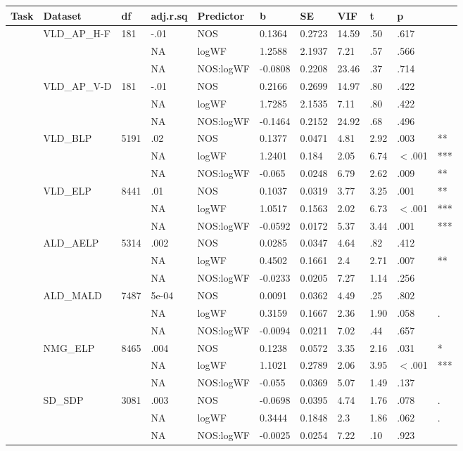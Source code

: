 \begin{table}[ht]
\centering
\begingroup\normalsize
\begin{tabular}{lllllllllll}
  \hline
Task & Dataset & df & adj.r.sq & Predictor & b & SE & VIF & t & p &  \\ 
  \hline
 & VLD\_AP\_H-F & 181 & -.01 & NOS & 0.1364 & 0.2723 & 14.59 & .50 & .617 &   \\ 
   &  &  & NA & logWF & 1.2588 & 2.1937 & 7.21 & .57 & .566 &   \\ 
   &  &  & NA & NOS:logWF & -0.0808 & 0.2208 & 23.46 & .37 & .714 &   \\ 
   & VLD\_AP\_V-D & 181 & -.01 & NOS & 0.2166 & 0.2699 & 14.97 & .80 & .422 &   \\ 
   &  &  & NA & logWF & 1.7285 & 2.1535 & 7.11 & .80 & .422 &   \\ 
   &  &  & NA & NOS:logWF & -0.1464 & 0.2152 & 24.92 & .68 & .496 &   \\ 
   & VLD\_BLP & 5191 & .02 & NOS & 0.1377 & 0.0471 & 4.81 & 2.92 & .003 & ** \\ 
   &  &  & NA & logWF & 1.2401 & 0.184 & 2.05 & 6.74 & $<$.001 & *** \\ 
   &  &  & NA & NOS:logWF & -0.065 & 0.0248 & 6.79 & 2.62 & .009 & ** \\ 
   & VLD\_ELP & 8441 & .01 & NOS & 0.1037 & 0.0319 & 3.77 & 3.25 & .001 & ** \\ 
   &  &  & NA & logWF & 1.0517 & 0.1563 & 2.02 & 6.73 & $<$.001 & *** \\ 
   &  &  & NA & NOS:logWF & -0.0592 & 0.0172 & 5.37 & 3.44 & .001 & *** \\ 
   & ALD\_AELP & 5314 & .002 & NOS & 0.0285 & 0.0347 & 4.64 & .82 & .412 &   \\ 
   &  &  & NA & logWF & 0.4502 & 0.1661 & 2.4 & 2.71 & .007 & ** \\ 
   &  &  & NA & NOS:logWF & -0.0233 & 0.0205 & 7.27 & 1.14 & .256 &   \\ 
   & ALD\_MALD & 7487 & 5e-04 & NOS & 0.0091 & 0.0362 & 4.49 & .25 & .802 &   \\ 
   &  &  & NA & logWF & 0.3159 & 0.1667 & 2.36 & 1.90 & .058 & . \\ 
   &  &  & NA & NOS:logWF & -0.0094 & 0.0211 & 7.02 & .44 & .657 &   \\ 
   & NMG\_ELP & 8465 & .004 & NOS & 0.1238 & 0.0572 & 3.35 & 2.16 & .031 & * \\ 
   &  &  & NA & logWF & 1.1021 & 0.2789 & 2.06 & 3.95 & $<$.001 & *** \\ 
   &  &  & NA & NOS:logWF & -0.055 & 0.0369 & 5.07 & 1.49 & .137 &   \\ 
   & SD\_SDP & 3081 & .003 & NOS & -0.0698 & 0.0395 & 4.74 & 1.76 & .078 & . \\ 
   &  &  & NA & logWF & 0.3444 & 0.1848 & 2.3 & 1.86 & .062 & . \\ 
   &  &  & NA & NOS:logWF & -0.0025 & 0.0254 & 7.22 & .10 & .923 &   \\ 
   \hline
\end{tabular}
\endgroup
\end{table}
